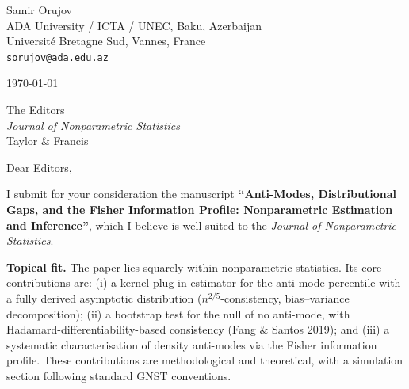 \documentclass[12pt,a4paper]{article}
\begin{document}
\pagestyle{empty}

\noindent
Samir Orujov\\
ADA University / ICTA / UNEC, Baku, Azerbaijan\\
Universit\'e Bretagne Sud, Vannes, France\\
\texttt{sorujov@ada.edu.az}

\bigskip
\noindent\today

\bigskip
\noindent
The Editors\\
\textit{Journal of Nonparametric Statistics}\\
Taylor \& Francis

\bigskip

\noindent Dear Editors,

\medskip

I submit for your consideration the manuscript \textbf{``Anti-Modes,
Distributional Gaps, and the Fisher Information Profile: Nonparametric
Estimation and Inference''}, which I believe is well-suited to the
\textit{Journal of Nonparametric Statistics}.

\medskip

\noindent\textbf{Topical fit.}
The paper lies squarely within nonparametric statistics.  Its core
contributions are: (i) a kernel plug-in estimator for the anti-mode
percentile with a fully derived asymptotic distribution ($n^{2/5}$-consistency,
bias--variance decomposition); (ii) a bootstrap test for the null of no
anti-mode, with Hadamard-differentiability-based consistency
(Fang \& Santos 2019); and (iii) a systematic characterisation of
density anti-modes via the Fisher information profile.  These contributions
are methodological and theoretical, with a simulation section following
standard GNST conventions.

\medskip
\end{document}
